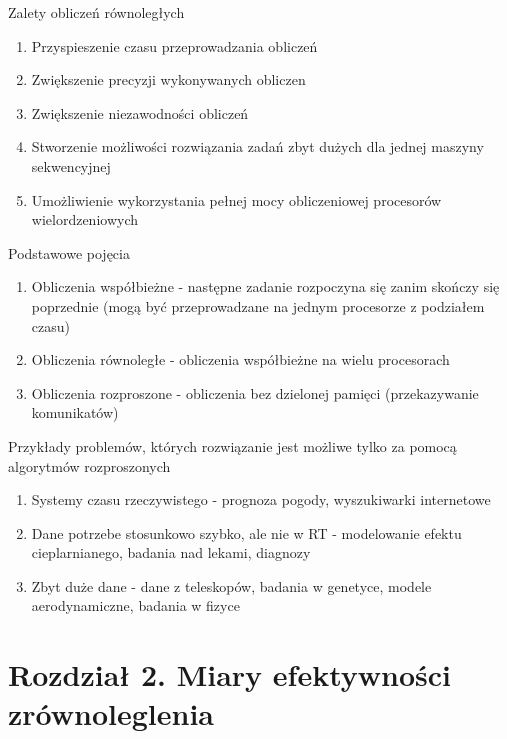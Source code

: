 \documentclass{beamer}
\begin{document}
\begin{frame}{Zalety obliczeń równoległych}
  \begin{enumerate}
  \item Przyspieszenie czasu przeprowadzania obliczeń
  \item Zwiększenie precyzji wykonywanych obliczen
  \item Zwiększenie niezawodności obliczeń
  \item Stworzenie możliwości rozwiązania zadań zbyt dużych dla jednej maszyny sekwencyjnej
  \item Umożliwienie wykorzystania pełnej mocy obliczeniowej procesorów wielordzeniowych
  \end{enumerate}
\end{frame}

\begin{frame}{Podstawowe pojęcia}
  \begin{enumerate}
  \item Obliczenia współbieżne - następne zadanie rozpoczyna się zanim skończy się poprzednie (mogą być przeprowadzane na jednym procesorze z podziałem czasu)
  \item Obliczenia równoległe - obliczenia współbieżne na wielu procesorach
  \item Obliczenia rozproszone - obliczenia bez dzielonej pamięci (przekazywanie komunikatów)
  \end{enumerate}
\end{frame}

\begin{frame}{Przykłady problemów, których rozwiązanie jest możliwe tylko za pomocą algorytmów rozproszonych}
  \begin{enumerate}
  \item Systemy czasu rzeczywistego - prognoza pogody, wyszukiwarki internetowe
  \item Dane potrzebe stosunkowo szybko, ale nie w RT - modelowanie efektu cieplarnianego, badania nad lekami, diagnozy
  \item Zbyt duże dane - dane z teleskopów, badania w genetyce, modele aerodynamiczne, badania w fizyce
  \end{enumerate}
\end{frame}

\section{Rozdział 2. Miary efektywności zrównoleglenia}
\end{document}
